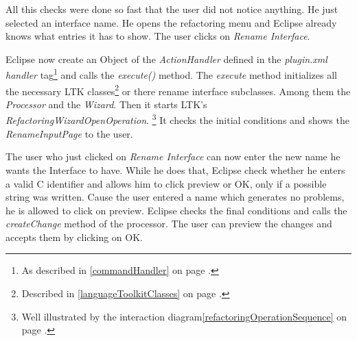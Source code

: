 \documentclass[a4paper,10pt]{report}
\begin{document}
All this checks were done so fast that the user did not notice anything. He just selected an interface name. He opens the refactoring menu and Eclipse already knows what entries
it has to show. The user clicks on {\it Rename Interface}.

Eclipse now create an Object of the {\it ActionHandler} defined in the {\it plugin.xml} {\it handler} tag\footnote{As described in \ref{commandHandler} on page \pageref{commandHandler}.} and calls the {\it execute()} method. 
The {\it execute} method initializes all the necessary LTK classes\footnote{Described in \ref{languageToolkitClasses} on page \pageref{languageToolkitClasses}.} 
or there rename interface subclasses. Among them the {\it Processor} and the {\it Wizard}. Then it starts LTK's {\it RefactoringWizardOpenOperation}.
\footnote{Well illustrated by the interaction diagram\ref{refactoringOperationSequence} on page \pageref{refactoringOperationSequence}.}
It checks the initial conditions and shows the {\it RenameInputPage} to the user.

The user who just clicked on {\it Rename Interface} can now enter the new name he wants the Interface to have. While he does that, Eclipse check whether he enters
a valid C identifier and allows him to click preview or OK, only if a possible string was written. Cause the user entered a name which generates no problems, he is allowed to click on
preview. Eclipse checks the final conditions and calls the {\it createChange} method of the processor. The user can preview the changes and accepts them by clicking on OK.
\end{document}
